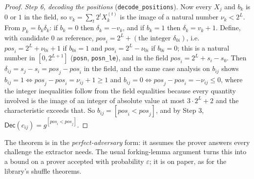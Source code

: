 \documentclass[11pt,a4paper]{article}
\newcommand{\Dec}{\mathsf{Dec}}
\newcommand{\pos}{\mathit{pos}}
\newcommand{\rocq}[1]{\texttt{#1}}
\theoremstyle{remark}
\begin{document}
\begin{proof}
\emph{Step 6, decoding the positions} (\rocq{decode\_positions}). Now
every $X_j$ and $b_k$ is $0$ or $1$ in the field, so $v_k = \sum_t 2^t
X^{(t)}_k$ is the image of a natural number $\nu_k < 2^L$. From $p_k = b_k
\delta_k$: if $b_k = 0$ then $\delta_k = -v_k$, and if $b_k = 1$ then
$\delta_k = v_k + 1$. Define, with candidate $0$ as reference, $\pos_i = 2^L
+ (\text{the integer } \delta_{0i})$, i.e.\ $\pos_i = 2^L + \nu_{0i} + 1$
if $b_{0i} = 1$ and $\pos_i = 2^L - \nu_{0i}$ if $b_{0i} = 0$; this is a
natural number in $[0, 2^{L+1}]$ (\rocq{posn}, \rocq{posn\_le}), and in
the field $\pos_i = 2^L + s_i - s_0$. Then $\delta_{ij} = s_j - s_i =
\pos_j - \pos_i$ in the field, and the same case analysis on $b_{ij}$ shows
$b_{ij} = 1 \Leftrightarrow \pos_j - \pos_i = \nu_{ij} + 1 \ge 1$ and
$b_{ij} = 0 \Leftrightarrow \pos_j - \pos_i = -\nu_{ij} \le 0$, where the
integer inequalities follow from the field equalities because every
quantity involved is the image of an integer of absolute value at most $3
\cdot 2^L + 2$ and the characteristic exceeds that. So $b_{ij} = [\pos_i <
\pos_j]$, and by Step 3, $\Dec(c_{ij}) = g^{[\pos_i < \pos_j]}$.
\end{proof}
The theorem is in the \emph{perfect-adversary} form: it assumes the prover
answers every challenge the extractor needs. The usual forking-lemma
argument turns this into a bound on a prover accepted with probability
$\varepsilon$; it is on paper, as for the library's shuffle theorems.
\end{document}
